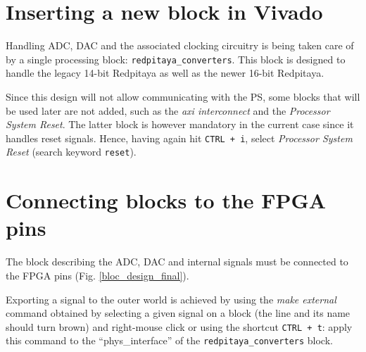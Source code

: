 \documentclass[10pt,oneside]{article}
\begin{document}
\section{Inserting a new block in Vivado}

Handling ADC, DAC and the associated clocking circuitry is being taken care
of by a single processing block: {\tt redpitaya\_converters}. This block is designed
to handle the legacy 14-bit Redpitaya as well as the newer 16-bit Redpitaya.

Since this design will not allow communicating with the PS, some blocks that will
be used later are not added, such as the {\em axi interconnect} and the
{\em Processor System Reset}. The latter block is however mandatory in the current case
since it handles reset signals. Hence, having again hit {\tt CTRL + i}, select 
{\em Processor System Reset} (search keyword {\tt reset}).

\section{Connecting blocks to the FPGA pins}

The block describing the ADC, DAC and internal signals must be connected
to the FPGA pins (Fig. \ref{bloc_design_final}).

Exporting a signal to the outer world is achieved by using the {\em make external} command
obtained by selecting a given signal on a block (the line and its name should turn brown) 
and right-mouse click or using the shortcut {\tt CTRL + t}: apply this command to the
``phys\_interface'' of the {\tt redpitaya\_converters} block.
\end{document}
